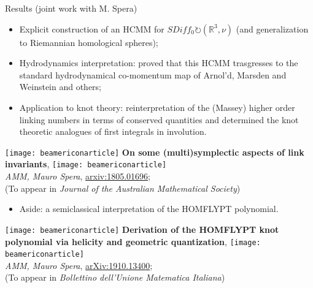 \documentclass[handout,10pt]{beamer}
\begin{document}
\begin{frame}[fragile]{Results (joint work with M. Spera)}
	\begin{itemize}[<+->]%
		\item[\CheckedBox]  Explicit construction of an HCMM for $SDiff_0 \circlearrowright (\mathbb{R}^3,\nu)$ (and generalization to Riemannian homological spheres);
		\item[\CheckedBox]  Hydrodynamics interpretation: proved that this HCMM trasgresses to the standard hydrodynamical co-momentum map of  Arnol'd, Marsden and Weinstein and others;
		\item[\CheckedBox]  Application to knot theory: reinterpretation of the (Massey) higher order linking numbers in terms of conserved quantities and determined the knot theoretic analogues of first integrals in involution.
	\end{itemize}
	\pause
	\begin{center}
		\texttt{[image: beamericonarticle]} 
		\textbf{On some (multi)symplectic aspects of link invariants},
		\texttt{[image: beamericonarticle]} \\ 
		\emph{AMM, Mauro Spera}, \href{https://arXiv.org/abs/1805.01696}{arxiv:1805.01696};\\
		(To appear in \emph{Journal of the Australian Mathematical Society})	
	\end{center}		
	\vfill \pause
	\begin{itemize}
		\item[\CheckedBox]  Aside: a semiclassical interpretation of the HOMFLYPT polynomial.
	\end{itemize}
	\pause
	\begin{center}
		\texttt{[image: beamericonarticle]} 
		\textbf{Derivation of the HOMFLYPT knot polynomial via helicity and geometric quantization},
		\texttt{[image: beamericonarticle]} \\ 
		\emph{AMM, Mauro Spera}, \href{https://arxiv.org/abs/1910.13400}{arXiv:1910.13400};\\
		(To appear in \emph{Bollettino dell'Unione Matematica Italiana})	
	\end{center}			
	
\end{frame}
\end{document}
